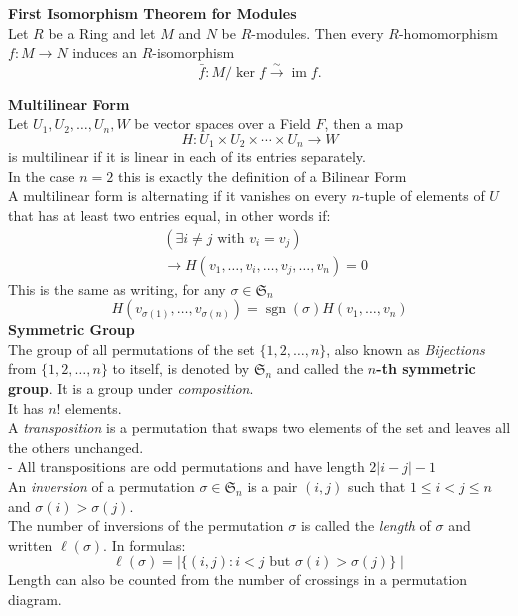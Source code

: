 \documentclass[a4paper, 10pt]{article}
\begin{document}
\begin{multicols*}{3}
\textbf{First Isomorphism Theorem for Modules}\\
Let $R$ be a Ring and let $M$ and $N$ be $R$-modules. 
Then every $R$-homomorphism $f: M \longrightarrow N$ induces an $R$-isomorphism
$$
\bar{f}: M / \operatorname{ker} f \xrightarrow{\sim} \operatorname{im} f .
$$

\textbf{Multilinear Form}\\
Let $U_1, U_2, \ldots, U_n, W$ be vector spaces over a Field $F$, then a map
$$
H: U_1 \times U_2 \times \cdots \times U_n \rightarrow W
$$
is multilinear if it is linear in each of its entries separately.\\
In the case $n=2$ this is exactly the definition of a Bilinear Form\\
A multilinear form is alternating if it vanishes on every $n$-tuple of elements of $U$ that has at least two entries equal, in other words if:
\begin{align*}
&\left(\exists i \neq j \text { with } v_i=v_j\right)\\
&\rightarrow H\left(v_1, \ldots, v_i, \ldots, v_j, \ldots, v_n\right)=0
\end{align*}
This is the same as writing, for any $\sigma \in \mathfrak{S}_n$
$$
H\left(v_{\sigma(1)}, \ldots, v_{\sigma(n)}\right)=\operatorname{sgn}(\sigma) H\left(v_1, \ldots, v_n\right)
$$
\textbf{Symmetric Group}\\
The group of all permutations of the set $\{1,2, \ldots, n\}$, also known as \textit{Bijections} from $\{1,2, \ldots, n\}$ to itself, is denoted by $\mathfrak{S}_n$ and called the \textbf{$n$-th symmetric group}. 
It is a group under \textit{composition}.\\
It has $n !$ elements.\\
A \textit{transposition} is a permutation that swaps two elements of the set and leaves all the others unchanged.\\
- All transpositions are odd permutations and have length $2|i-j|-1$\\
An \textit{inversion} of a permutation $\sigma \in \mathfrak{S}_n$ is a pair $(i, j)$ such that $1 \leqslant i<j \leqslant n$ and $\sigma(i)>\sigma(j)$.\\
The number of inversions of the permutation $\sigma$ is called the \textit{length} of $\sigma$ and written $\ell(\sigma)$. In formulas:\\
$$
\ell(\sigma)=\mid\{(i, j): i<j \text { but } \sigma(i)>\sigma(j)\} \mid
$$
Length can also be counted from the number of crossings in a permutation diagram.

\end{multicols*}
\end{document}
